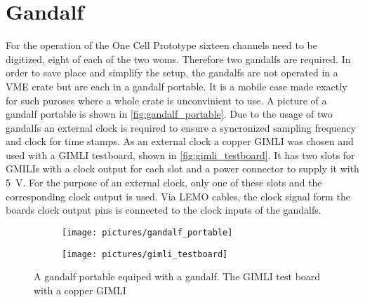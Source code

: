 \section{Gandalf}

For the operation of the One Cell Prototype sixteen channels need to be digitized, eight of each of the two \acp{wom}.
Therefore two \acp{gandalf} are required.
In order to save place and simplify the setup, the \acp{gandalf} are not operated in a VME crate but are each in a \ac{gandalf} portable.
It is a mobile case made exactly for such puroses where a whole crate is unconvinient to use.
A picture of a \ac{gandalf} portable is shown in \autoref{fig:gandalf_portable}.
Due to the usage of two \acp{gandalf} an external clock is required to ensure a syncronized sampling frequency and clock for time stamps.
As an external clock a copper GIMLI was chosen and used with a GIMLI testboard, shown in \autoref{fig:gimli_testboard}.
It has two slots for GMILIs with a clock output for each slot and a power connector to supply it with \SI{5}{\volt}.
For the purpose of an external clock, only one of these slots and the corresponding clock output is used.
Via LEMO cables, the clock signal form the boards clock output pins is connected to the clock inputs of the \acp{gandalf}.
\begin{figure}
	\centering
	\begin{subfigure}[b]{.4\textwidth}
		\centering
		\texttt{[image: pictures/gandalf\_portable]} 
		\caption[A \ac{gandalf} portable equiped with a \ac{gandalf}.]{}
		\label{}
	\end{subfigure}
	\begin{subfigure}[b]{.55\textwidth}
		\centering
		\texttt{[image: pictures/gimli\_testboard]}
		\caption[]{}
		\label{}
	\end{subfigure}
	\caption[]{A \ac{gandalf} portable equiped with a \ac{gandalf}. The GIMLI test board with a copper GIMLI}
	\label{}
\end{figure}
